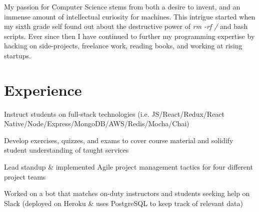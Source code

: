 \documentclass[letterpaper]{deedy-resume} %
\begin{document}
\hfill
%
%
\begin{minipage}[t]{0.66\textwidth} %


  My passion for Computer Science stems from both a desire to invent,
  and an immense amount of intellectual curiosity for machines. This
  intrigue started when my sixth grade self found
  out about the destructive power of {\it rm -rf /} and bash scripts.
  Ever since then I have continued to further my programming
  expertise by hacking on side-projects, freelance work,
  reading books, and working at rising startups.
  


  \section{Experience}



  \begin{tightitemize}
  \item Instruct students on full-stack technologies (i.e. JS/React/Redux/React Native/Node/Express/MongoDB/AWS/Redis/Mocha/Chai)
  \item Develop exercises, quizzes, and exams to cover course material and solidify student understanding of taught services
  \item Lead standup \& implemented Agile project management tactics for four different project teams
  \item Worked on a bot that matches on-duty instructors and students seeking help on Slack (deployed on Heroku \& uses PostgreSQL to keep track of relevant data)
  \end{tightitemize}


\end{minipage}
\end{document}
